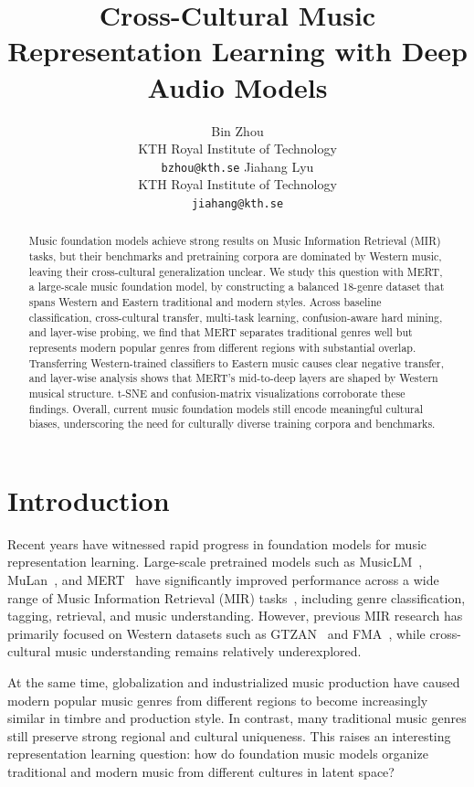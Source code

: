 \documentclass{article}
\title{Cross-Cultural Music Representation Learning with Deep Audio Models}
\author{
 Bin Zhou \\
 KTH Royal Institute of Technology \\
 \texttt{bzhou@kth.se}
 \And
 Jiahang Lyu \\
 KTH Royal Institute of Technology \\
 \texttt{jiahang@kth.se}
}
\begin{document}
\maketitle

\begin{abstract}
Music foundation models achieve strong results on Music Information Retrieval (MIR) tasks, but their benchmarks and pretraining corpora are dominated by Western music, leaving their cross-cultural generalization unclear. We study this question with MERT, a large-scale music foundation model, by constructing a balanced 18-genre dataset that spans Western and Eastern traditional and modern styles. Across baseline classification, cross-cultural transfer, multi-task learning, confusion-aware hard mining, and layer-wise probing, we find that MERT separates traditional genres well but represents modern popular genres from different regions with substantial overlap. Transferring Western-trained classifiers to Eastern music causes clear negative transfer, and layer-wise analysis shows that MERT's mid-to-deep layers are shaped by Western musical structure. t-SNE and confusion-matrix visualizations corroborate these findings. Overall, current music foundation models still encode meaningful cultural biases, underscoring the need for culturally diverse training corpora and benchmarks.
\end{abstract}

\section{Introduction}

Recent years have witnessed rapid progress in foundation models for music representation learning. Large-scale pretrained models such as MusicLM~\cite{agostinelli2023musiclm}, MuLan~\cite{huang2022mulan}, and MERT~\cite{li2024mert} have significantly improved performance across a wide range of Music Information Retrieval (MIR) tasks~\cite{humphrey2013feature, lee2009unsupervised, van2013deep}, including genre classification, tagging, retrieval, and music understanding. However, previous MIR research has primarily focused on Western datasets such as GTZAN~\cite{tzanetakis2002musical} and FMA~\cite{defferrard2016fma}, while cross-cultural music understanding remains relatively underexplored.

At the same time, globalization and industrialized music production have caused modern popular music genres from different regions to become increasingly similar in timbre and production style. In contrast, many traditional music genres still preserve strong regional and cultural uniqueness. This raises an interesting representation learning question: how do foundation music models organize traditional and modern music from different cultures in latent space?
\end{document}
